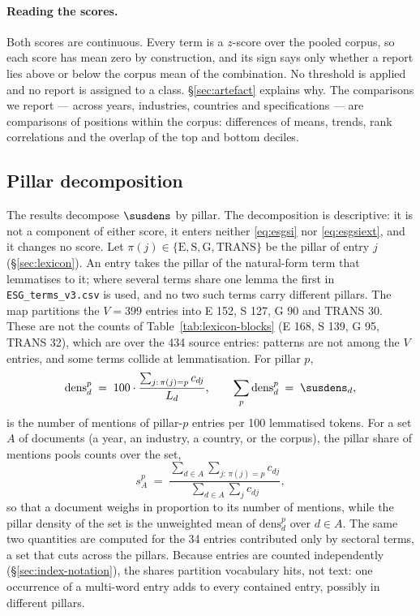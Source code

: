 \paragraph{Reading the scores.} Both scores are continuous. Every term is a
$z$-score over the pooled corpus, so each score has mean zero by construction,
and its sign says only whether a report lies above or below the corpus mean
of the combination. No threshold is applied and no report is assigned to a
class. \S\ref{sec:artefact} explains why. The comparisons we report --- across
years, industries, countries and specifications --- are comparisons of positions
within the corpus: differences of means, trends, rank correlations and the
overlap of the top and bottom deciles.

\subsection{Pillar decomposition}
\label{sec:index-pillars}

The results decompose $\susdens$ by pillar. The decomposition is descriptive:
it is not a component of either score, it enters neither \eqref{eq:esgsi}
nor \eqref{eq:esgsiext}, and it changes no score. Let $\pi(j) \in
\{\mathrm{E}, \mathrm{S}, \mathrm{G}, \mathrm{TRANS}\}$ be the pillar of entry
$j$ (\S\ref{sec:lexicon}). An entry takes the pillar of the natural-form term
that lemmatises to it; where several terms share one lemma the first in
\texttt{ESG\_terms\_v3.csv} is used, and no two such terms carry different pillars.
The map partitions the $V = 399$ entries into E 152, S 127, G 90 and TRANS 30.
These are not the counts of Table~\ref{tab:lexicon-blocks} (E 168, S 139,
G 95, TRANS 32), which are over the 434 source entries: patterns are not
among the $V$ entries, and some terms collide at lemmatisation. For pillar $p$,
\begin{equation}
\label{eq:pillar-density}
\mathrm{dens}^{p}_d \;=\; 100 \cdot \frac{\sum_{j:\,\pi(j)=p} c_{dj}}{L_d},
\qquad \sum_{p} \mathrm{dens}^{p}_d \;=\; \susdens_d ,
\end{equation}
is the number of mentions of pillar-$p$ entries per 100 lemmatised tokens.
For a set $A$ of documents (a year, an industry, a country, or the corpus),
the pillar share of mentions pools counts over the set,
\begin{equation}
\label{eq:pillar-share}
s^{p}_A \;=\; \frac{\sum_{d \in A} \sum_{j:\,\pi(j)=p} c_{dj}}
                   {\sum_{d \in A} \sum_{j} c_{dj}},
\end{equation}
so that a document weighs in proportion to its number of mentions, while the
pillar density of the set is the unweighted mean of
$\mathrm{dens}^{p}_d$ over $d \in A$. The same two quantities are computed
for the 34 entries contributed only by sectoral terms, a set that cuts across
the pillars. Because entries are counted independently (\S\ref{sec:index-notation}),
the shares partition vocabulary hits, not text: one occurrence of a
multi-word entry adds to every contained entry, possibly in different
pillars.

